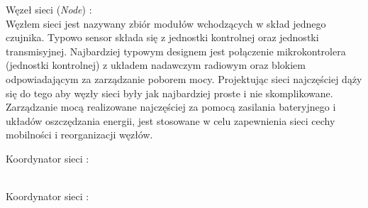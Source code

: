 \par Węzeł sieci (\textit{Node}) : \\
\tab Węzłem sieci jest nazywany zbiór modułów wchodzących w skład jednego czujnika. Typowo sensor składa się z jednostki kontrolnej oraz jednostki transmisyjnej. Najbardziej typowym designem jest połączenie mikrokontrolera (jednostki kontrolnej) z układem nadawczym radiowym oraz blokiem odpowiadającym za zarządzanie poborem mocy. Projektując sieci najczęściej dąży się do tego aby węzły sieci były jak najbardziej proste i nie skomplikowane. Zarządzanie mocą realizowane najczęściej za pomocą zasilania bateryjnego i układów oszczędzania energii, jest stosowane w celu zapewnienia sieci cechy mobilności i reorganizacji węzłów.
\\
\par Koordynator sieci : \\
\tab
\\
\par Koordynator sieci : \\
\tab



\clearpage